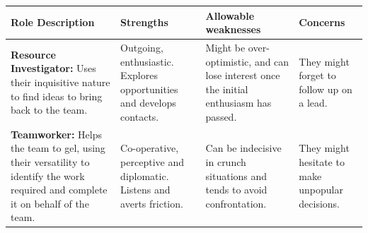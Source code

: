 \documentclass[]{book}
\begin{document}
\begin{longtable}[]{@{}llll@{}}
\toprule
\begin{minipage}[b]{0.21\columnwidth}\raggedright
Role Description\strut
\end{minipage} & \begin{minipage}[b]{0.25\columnwidth}\raggedright
Strengths\strut
\end{minipage} & \begin{minipage}[b]{0.20\columnwidth}\raggedright
Allowable weaknesses\strut
\end{minipage} & \begin{minipage}[b]{0.22\columnwidth}\raggedright
Concerns\strut
\end{minipage}\tabularnewline
\midrule
\endhead
\begin{minipage}[t]{0.21\columnwidth}\raggedright
\textbf{Resource Investigator:} Uses their inquisitive nature to find ideas to bring back to the team.\strut
\end{minipage} & \begin{minipage}[t]{0.25\columnwidth}\raggedright
Outgoing, enthusiastic. Explores opportunities and develops contacts.\strut
\end{minipage} & \begin{minipage}[t]{0.20\columnwidth}\raggedright
Might be over-optimistic, and can lose interest once the initial enthusiasm has passed.\strut
\end{minipage} & \begin{minipage}[t]{0.22\columnwidth}\raggedright
They might forget to follow up on a lead.\strut
\end{minipage}\tabularnewline
\begin{minipage}[t]{0.21\columnwidth}\raggedright
\textbf{Teamworker:} Helps the team to gel, using their versatility to identify the work required and complete it on behalf of the team.\strut
\end{minipage} & \begin{minipage}[t]{0.25\columnwidth}\raggedright
Co-operative, perceptive and diplomatic. Listens and averts friction.\strut
\end{minipage} & \begin{minipage}[t]{0.20\columnwidth}\raggedright
Can be indecisive in crunch situations and tends to avoid confrontation.\strut
\end{minipage} & \begin{minipage}[t]{0.22\columnwidth}\raggedright
They might hesitate to make unpopular decisions.\strut
\end{minipage}\tabularnewline

\end{longtable}
\end{document}
